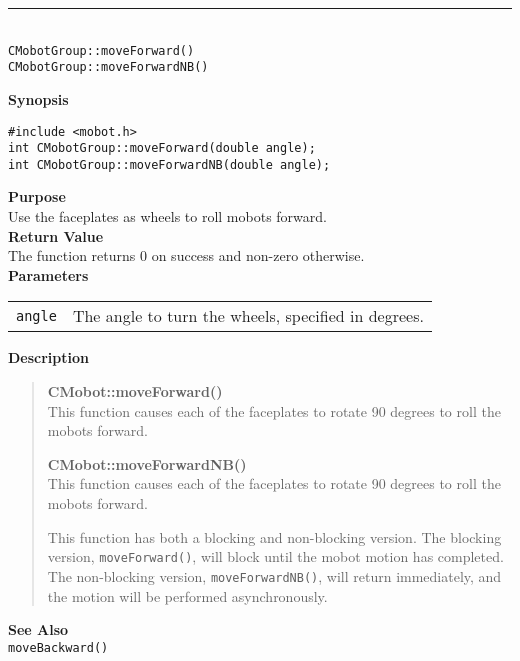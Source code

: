 \noindent
\vspace{5pt}
\rule{4.5in}{0.015in}\\
\noindent
{\LARGE \texttt{CMobotGroup::moveForward()}}\\
{\LARGE \texttt{CMobotGroup::moveForwardNB()}}\\
{}

\noindent
{\bf Synopsis}
\vspace{-8pt}
\begin{verbatim}
#include <mobot.h>
int CMobotGroup::moveForward(double angle);
int CMobotGroup::moveForwardNB(double angle);
\end{verbatim}

\noindent
{\bf Purpose}\\
Use the faceplates as wheels to roll mobots forward.\\

\noindent
{\bf Return Value}\\
The function returns 0 on success and non-zero otherwise.\\

\noindent
{\bf Parameters}\\
\vspace{-0.1in}
\begin{description}
\item               
\begin{tabular}{p{15 mm}p{145 mm}}
\texttt{angle} & The angle to turn the wheels, specified in degrees.\\
\end{tabular}
\end{description}

\noindent
{\bf Description}\\
\vspace{-12pt}
\begin{quote}
{\bf CMobot::moveForward()}\\
This function causes each of the faceplates to rotate 90 degrees to roll the
mobots forward.

{\bf CMobot::moveForwardNB()}\\
This function causes each of the faceplates to rotate 90 degrees to roll the
mobots forward.

This function has both a blocking and non-blocking version.
The blocking version, \texttt{moveForward()}, will block until the
mobot motion has completed. The non-blocking version, \texttt{moveForwardNB()},
will return immediately, and the motion will be performed asynchronously.\\
\end{quote}

\noindent
{\bf See Also}\\
\texttt{moveBackward()}

